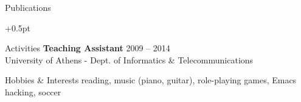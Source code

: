 \documentclass{resume}
\begin{document}
\begin{rSection}{Publications}
  \begin{rSubsection}{}{}{}{}
    \itemsep +0.5pt %
  \item {}
  \item {}
  \item {}
  \item {}
  \item {}
  \item {}
  \item {}
  \end{rSubsection}
\end{rSection}




\begin{rSection}{Activities}
  {\bf Teaching Assistant} \hfill {2009 -- 2014} \\
  University of Athens - Dept. of Informatics \& Telecommunications \\
\end{rSection}

\begin{rSection}{Hobbies \& Interests}
  reading, music (piano, guitar), role-playing games, Emacs hacking, soccer \\
\end{rSection}
\end{document}
